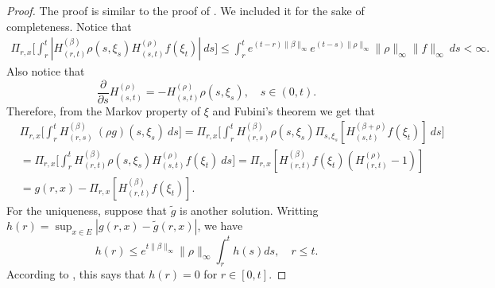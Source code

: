 \documentclass[12pt]{amsart}
\theoremstyle{plain}
\theoremstyle{definition}
\numberwithin{equation}{section}
\begin{document}
\begin{proof}
    The proof is similar to the proof of \cite[Lemma A.1.5]{Dynkin1993Superprocesses}. We included it for the sake of completeness.
    Notice that
\begin{align}
    \Pi_{r,x} \Big[ \int_r^t | H_{(r,t)}^{(\beta)}\rho(s,\xi_s) H_{(s,t)}^{(\rho)} f(\xi_t)| ~ds \Big]
    \leq  \int_r^t e^{(t-r)\|\beta\|_\infty}e^{(t-s)\|\rho\|_\infty}\|\rho\|_\infty\|f\|_\infty ~ds
    < \infty.
\end{align}
    Also notice that
\begin{equation}
\label{eq: crucial for Feynman-Kac}
    \frac{\partial}{\partial s} H^{(\rho)}_{(s,t)}= -H^{(\rho)}_{(s,t)}\rho(s,\xi_s),
    \quad s\in (0,t).
\end{equation}
    Therefore, from the Markov property of $\xi$ and Fubini's theorem we get that
\begin{align}
    &\Pi_{r,x} \Big[ \int_r^tH_{(r,s)}^{(\beta)}~(\rho g)(s,\xi_s)~ds \Big]
    =\Pi_{r,x} \Big[ \int_r^t H_{(r,s)}^{(\beta)}\rho(s,\xi_s) \Pi_{s,\xi_s}[ H_{(s,t)}^{(\beta+\rho)} f(\xi_t)]~ds \Big]
    \\&= \Pi_{r,x} \Big[ \int_r^t H_{(r,t)}^{(\beta)}\rho(s,\xi_s) H_{(s,t)}^{(\rho)} f(\xi_t) ~ds \Big]
    = \Pi_{r,x} [ H_{(r,t)}^{(\beta)}f(\xi_t)(H_{(r,t)}^{(\rho)} - 1)]
    \\&= g(r,x) - \Pi_{r,x} [ H_{(r,t)}^{(\beta)} f(\xi_t)].
\end{align}
    For the uniqueness, suppose that $\tilde g$ is another solution. Writting $h(r) = \sup_{x\in E}|g(r,x) - \tilde g(r,x)|$, we have
\[
    h(r) \leq e^{t\|\beta\|_\infty}\|\rho\|_\infty \int_r^t h(s)ds,
    \quad r\le t.
\]
    According to \cite[Lemma A.1.5]{Dynkin1993Superprocesses}, this says that $h(r) =  0$ for $r\in [0,t]$.
\end{proof}
\end{document}
